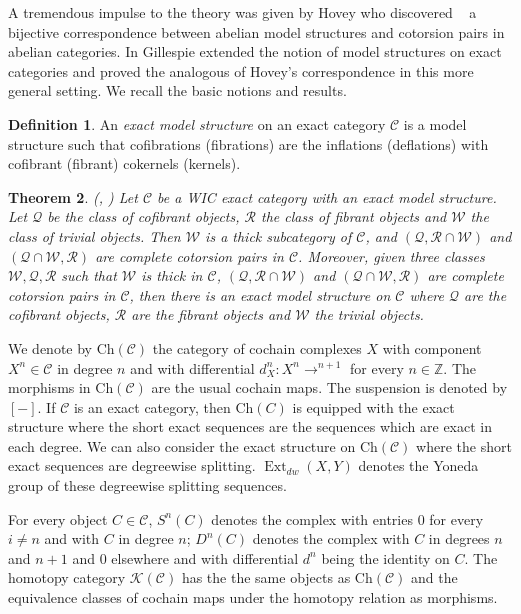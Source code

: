 \documentclass[11pt,a4paper,reqno]{amsart}
\newcommand{\bbZ}{\mathbb{Z}}
\newcommand{\Ext}{\operatorname{Ext}}
\newcommand{\C}{\mathcal{C}}
\newcommand{\K}{\mathcal{K}}
\newcommand{\clQ}{\mathcal{Q}}
\newcommand{\R}{\mathcal{R}}
\newcommand{\W}{\mathcal{W}}
\newcommand{\Ch}{\mathrm{Ch}}
\theoremstyle{plain}
\newtheorem{thm}{Theorem}[section]
\theoremstyle{definition}
\newtheorem{defn}[thm]{Definition}
\theoremstyle{remark}
\begin{document}
A tremendous impulse to the theory was given by  Hovey who discovered ~\cite{Hov07} a bijective correspondence between abelian model structures and cotorsion pairs in abelian categories.
%
In \cite{G5} Gillespie extended the notion of model structures on exact categories and proved the analogous of Hovey's correspondence in this more general setting.
 We recall the basic notions and results.
  \begin{defn}\label{D:exact-model} An \emph{exact model structure} on an exact category $\C$ is a model structure such that cofibrations (fibrations) are the inflations (deflations) with cofibrant (fibrant) cokernels (kernels).
\end{defn}
%
\begin{thm}\label{T:correspondence} (\cite{Hov07}, \cite{G5}) Let $\C$ be a WIC exact category with an exact model structure. Let $\clQ$ be the class of cofibrant objects, $\R$ the class of fibrant objects and $\W$ the class of trivial objects. Then $\W$ is a thick subcategory of $\C$, and $(\clQ, \R\cap \W)$ and $(\clQ\cap\W, \R)$ are complete cotorsion pairs in $\C$.
Moreover, given three classes $\W, \clQ, \R$ such that $\W$ is thick in $\C$, $(\clQ, \R\cap \W)$ and $(\clQ\cap\W, \R)$ are complete cotorsion pairs in $\C$, then there is an exact model structure on $\C$ where $\clQ$ are the cofibrant objects, $\R$ are the fibrant objects and $\W$ the trivial objects.
\end{thm}

We denote by $\Ch(\C)$ the category of cochain complexes $X$ with component $X^n\in \C$ in degree $n$ and with differential $d^n_X\colon X^n\to ^{n+1}$ for every $n\in \bbZ$. The morphisms in $\Ch(\C)$ are the usual cochain maps. The suspension is denoted by $[-]$.
 If $\C$ is an exact category, then $\Ch(C)$ is equipped with the exact structure where the short exact sequences are the sequences which are exact in each degree. We can also consider the exact structure on $\Ch(\C)$ where the short exact sequences are degreewise splitting. $\Ext_{dw}(X, Y)$ denotes the Yoneda group of these degreewise splitting sequences.

 For every object $C\in \C$, $S^n(C)$ denotes the complex with entries $0$ for every $i\neq n$ and with $C$ in degree $n$; $D^n(C)$ denotes the complex with $C$ in degrees $n$ and $n+1$ and $0$ elsewhere and with differential $d^n$ being the identity on $C$. The homotopy category $\K(\C)$ has the the same objects as $\Ch(\C)$ and the equivalence classes of cochain maps under the homotopy relation as morphisms.
\end{document}
